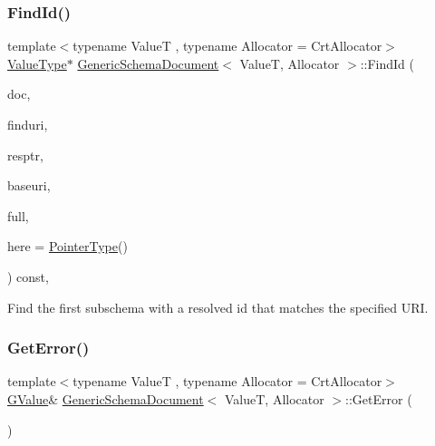 \subsubsection{\texorpdfstring{Find\+Id()}{FindId()}}
{\footnotesize\ttfamily template$<$typename ValueT , typename Allocator  = Crt\+Allocator$>$ \\
\hyperlink{classGenericSchemaDocument_ae246f1b6573a5a8a2c0d73d4eb64d53a}{Value\+Type}$\ast$ \hyperlink{classGenericSchemaDocument}{Generic\+Schema\+Document}$<$ ValueT, Allocator $>$\+::Find\+Id (\begin{DoxyParamCaption}\item[{const \hyperlink{classGenericSchemaDocument_ae246f1b6573a5a8a2c0d73d4eb64d53a}{Value\+Type} \&}]{doc,  }\item[{const \hyperlink{classGenericSchemaDocument_afcfefaab7eecec6849d478557392e23c}{Uri\+Type} \&}]{finduri,  }\item[{\hyperlink{classGenericSchemaDocument_aeb62f562d4dc024402b00f97cbcef747}{Pointer\+Type} \&}]{resptr,  }\item[{const \hyperlink{classGenericSchemaDocument_afcfefaab7eecec6849d478557392e23c}{Uri\+Type} \&}]{baseuri,  }\item[{bool}]{full,  }\item[{const \hyperlink{classGenericSchemaDocument_aeb62f562d4dc024402b00f97cbcef747}{Pointer\+Type} \&}]{here = {\ttfamily \hyperlink{classGenericSchemaDocument_aeb62f562d4dc024402b00f97cbcef747}{Pointer\+Type}()} }\end{DoxyParamCaption}) const\hspace{0.3cm}{\ttfamily [inline]}, {\ttfamily [private]}}



Find the first subschema with a resolved \textquotesingle{}id\textquotesingle{} that matches the specified U\+RI. 

\mbox{\label{classGenericSchemaDocument_a2e3e3628b352678ff459f6e4ad613ba4}} 
\subsubsection{\texorpdfstring{Get\+Error()}{GetError()}\hspace{0.1cm}{\footnotesize\ttfamily [1/2]}}
{\footnotesize\ttfamily template$<$typename ValueT , typename Allocator  = Crt\+Allocator$>$ \\
\hyperlink{classGenericSchemaDocument_a777505b09fff6cf23b8cfed9e0350eec}{G\+Value}\& \hyperlink{classGenericSchemaDocument}{Generic\+Schema\+Document}$<$ ValueT, Allocator $>$\+::Get\+Error (\begin{DoxyParamCaption}{ }\end{DoxyParamCaption})\hspace{0.3cm}{\ttfamily [inline]}}



